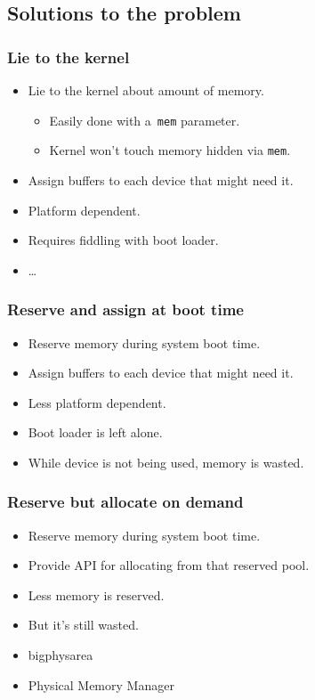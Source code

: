 \subsection{Solutions to the problem}

\begin{frame}
  \frametitle{Lie to the kernel}

  \begin{itemize}
  \item Lie to the kernel about amount of memory.
    \begin{itemize}
    \item Easily done with a~\lstinline|mem| parameter.
    \item Kernel won't touch memory hidden via \lstinline|mem|.
    \end{itemize}
  \item Assign buffers to each device that might need it.
  \item Platform dependent.
  \item Requires fiddling with boot loader.
  \item \ldots
  \end{itemize}
\end{frame}

\begin{frame}
  \frametitle{Reserve and assign at boot time}

  \begin{itemize}
  \item Reserve memory during system boot time.
  \item Assign buffers to each device that might need it.
  \item Less platform dependent.
  \item Boot loader is left alone.
  \item While device is not being used, memory is wasted.
  \end{itemize}
\end{frame}

\begin{frame}
  \frametitle{Reserve but allocate on demand}

  \begin{itemize}
  \item Reserve memory during system boot time.
  \item Provide API for allocating from that reserved pool.
  \item Less memory is reserved.
  \item But it's still wasted.
  \end{itemize}

  \begin{itemize}
  \item bigphysarea
  \item Physical Memory Manager
  \end{itemize}
\end{frame}

